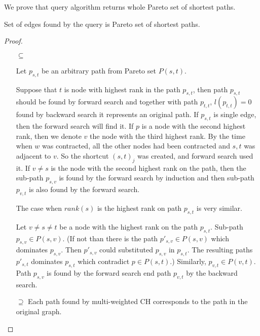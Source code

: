 We prove that query algorithm returns whole Pareto set of shortest paths.

\begin{lemma}
Set of edges found by the query is Pareto set of shortest paths.
\end{lemma}
\begin{proof}
\begin{itemize}
\item[$\subseteq$] 

Let $p_{s,t}$ be an arbitrary path from Pareto set $P(s,t)$. 

Suppose that $t$ is node with highest rank in the path $p_{s,t}$, 
then path $p_{s,t}$ should be found by forward search
and together with path $p_{t,t}$, $l(p_{t,t})=0$ 
found by backward search it represents an original path.
If $p_{s,t}$ is single edge, then the forward search will find it.
If $p$ is a node with the second highest rank, then we denote $v$ the
node with the third highest rank. 
By the time when $w$ was contracted, all the other nodes had been contracted
and $s,t$ was adjacent to $v$. So the shortcut $(s,t)_j$ was created, and forward search used it.
If $v \ne s$ is the node with the second highest rank on the path,
then the sub-path $p_{s,v}$ is found by the forward search by induction and
then sub-path $p_{v,t}$ is also found by the forward search.

The case when $rank(s)$ is the highest rank on path $p_{s,t}$ is very similar. 

Let $v \ne s \ne t$ be a node with the highest rank on the path $p_{s,t}$. 
Sub-path $p_{s,v} \in P(s,v)$. 
(If not than there is the path $p'_{s,v} \in P(s,v)$ which dominates $p_{s,v}$. 
Then $p'_{s,v}$ could substituted $p_{s,v}$ in $p_{s,t}$. The resulting paths $p'_{s,t}$ 
dominates $p_{s,t}$ which contradict $p \in P(s,t)$.)
Similarly, $p_{v,t} \in P(v,t) $. Path $p_{s,v}$ is found by the forward search end path
$p_{v,t}$ by the backward search.

\item[$\supseteq$] 
Each path found by multi-weighted CH corresponds to the path in the original graph. 

\end{itemize}
\end{proof}

